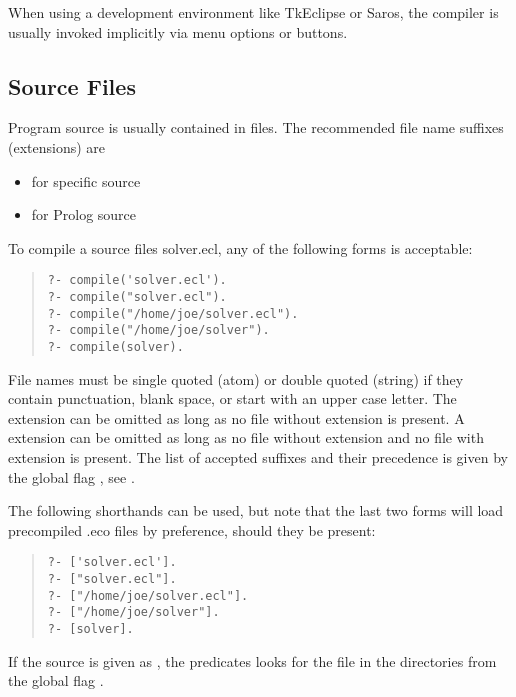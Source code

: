 When using a development environment like
TkEclipse or Saros, the compiler is usually invoked implicitly via
menu options or buttons.

\subsection{Source Files}

Program source is usually contained in files.  The recommended file name
suffixes (extensions) are
\begin{itemize}
\item {} for {\eclipse} specific source
\item {} for Prolog source
\end{itemize}
To compile a source files solver.ecl, any of the following forms is
acceptable:
\begin{quote}
\begin{verbatim}
?- compile('solver.ecl').
?- compile("solver.ecl").
?- compile("/home/joe/solver.ecl").
?- compile("/home/joe/solver").
?- compile(solver).
\end{verbatim}
\end{quote}
File names must be single quoted (atom) or double quoted (string)
if they contain punctuation, blank space, or start with an upper case letter.
The  extension can be omitted as long as no file without
extension
is present. A  extension can be omitted as long as no file without
extension and no file with  extension is present. The list of
accepted suffixes and their precedence is given by the global flag
, see
.

The following shorthands can be used, but note that the last two forms
will load precompiled .eco files by preference, should they be present:
\begin{quote}
\begin{verbatim}
?- ['solver.ecl'].
?- ["solver.ecl"].
?- ["/home/joe/solver.ecl"].
?- ["/home/joe/solver"].
?- [solver].
\end{verbatim}
\end{quote}

If the source is given as , the predicates
looks for the file
in the directories from the global flag .

